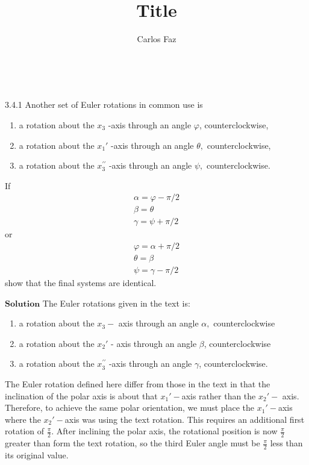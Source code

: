 \documentclass{article}
\title{Title}
\author{Carlos Faz}
\date{ \ }
\begin{document}
\maketitle

\begin{flushleft}




\begin{mybox}{3.4.1}
Another set of Euler rotations in common use is
\begin{enumerate}[$(a)$]
\item a rotation about the $x_{3}$ -axis through an angle $\varphi$, counterclockwise,
\item a rotation about the $x_{1}'$ -axis through an angle $\theta,$ counterclockwise,
\item a rotation about the $x_{3}^{\prime \prime}$ -axis through an angle $\psi,$ counterclockwise.
\end{enumerate}
If 
$$
\begin{array}{l}
\alpha=\varphi-\pi / 2 \\
\beta=\theta \\
\gamma=\psi+\pi / 2
\end{array}
$$
or
$$
\begin{array}{l}
\varphi=\alpha+\pi / 2 \\
\theta=\beta \\
\psi=\gamma-\pi / 2
\end{array}
$$
show that the final systems are identical.
\end{mybox}

$\boxed{\textbf{Solution}}$ The Euler rotations given in the text is:
\begin{enumerate}
\item a rotation about the $x_{3}-$ axis through an angle $\alpha,$ counterclockwise
\item a rotation about the $x_{2}'$ - axis through an angle $\beta$, counterclockwise
\item a rotation about the $x_{3}^{\prime \prime}$ -axis through an angle $\gamma$, counterclockwise.
\end{enumerate}
The Euler rotation defined here differ from those in the text in that the inclination of the polar axis is about that $x_{1}'-$axis rather than the $x_{2}'-$ axis. Therefore, to achieve the same polar orientation, we must place the $x_{1}'-$axis where the $x_{2}'-$axis was using the text rotation. This requires an additional first rotation of $\frac{\pi}{2}$. After inclining the polar axis, the rotational position
is now $\frac{\pi}{2}$ greater than form the text rotation, so the third Euler angle must be $\frac{\pi}{2}$ less than its original value.




\end{flushleft}
\end{document}
